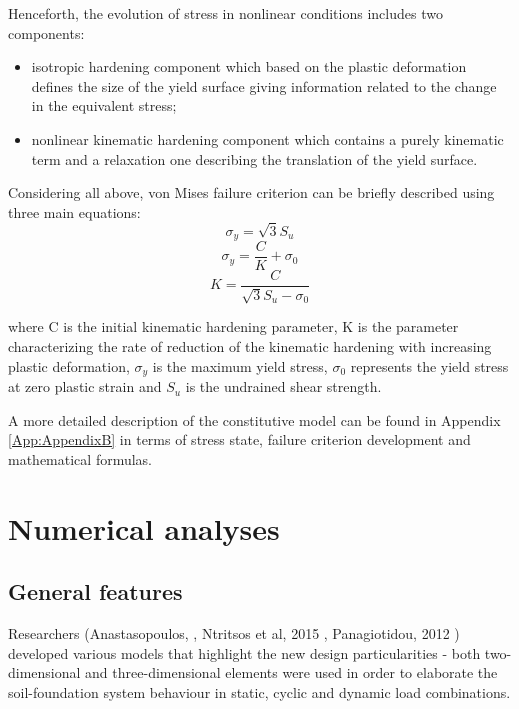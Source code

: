 \documentclass[12pt,a4paper]{report}
\begin{document}
Henceforth, the evolution of stress in nonlinear conditions includes two components:

\begin{itemize}
	\item 	isotropic hardening component which based on the plastic deformation defines the size of the yield surface giving information related to the change in the equivalent stress;
	\item 	nonlinear kinematic hardening component which contains a purely kinematic term and a relaxation one describing the translation of the yield surface.
	\end{itemize}
	
	
Considering all above, von Mises failure criterion can be briefly described using three main equations:
\begin{equation}
\sigma_y = \sqrt{3}S_u
\end{equation}
\begin{equation}
\sigma_y = \frac{C}{K}+\sigma_0
\end{equation}
\begin{equation}
K=\frac{C}{\sqrt{3}S_u-\sigma_0}
\end{equation}

where C is the initial kinematic hardening parameter, K is the parameter characterizing the rate of reduction of the kinematic hardening with increasing plastic deformation, $\sigma_y$ is the maximum yield stress, $\sigma_0$ represents the yield stress at zero plastic strain and $S_u$ is the undrained shear strength. 

A more detailed description of the constitutive model can be found in Appendix \ref{App:AppendixB} in terms of stress state, failure criterion development and mathematical formulas.

\section{Numerical analyses}
\subsection{General features}
Researchers (Anastasopoulos, \cite{anastasopoulos2014simplified}, Ntritsos et al, 2015 \cite{ntritsos2015static}, Panagiotidou, 2012 \cite{panagiotidou2012pushover}) \mbox{developed} various models that highlight the new design particularities - both two-dimensional and three-dimensional elements were used in order to elaborate the soil-foundation system behaviour in static, cyclic and dynamic load combinations. 
\end{document}
